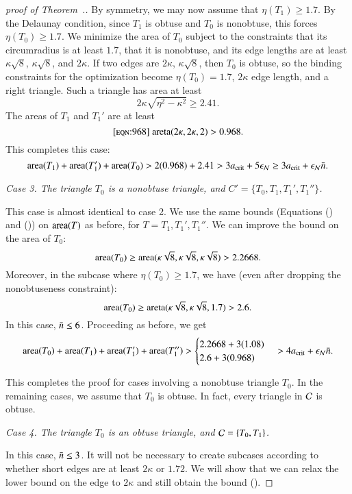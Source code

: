 \begin{proof}[proof of Theorem~.]
By symmetry, we may now assume that $\eta(T_1) \ge 1.7$.  By the
Delaunay condition, since $T_1$ is obtuse and $T_0$ is nonobtuse, this
forces $\eta(T_0)\ge 1.7$.  We minimize the area of $T_0$ subject to
the constraints that its circumradius is at least $1.7$, that it is
nonobtuse, and its edge lengths are at least $\kappa\sqrt{8}$,
$\kappa\sqrt{8}$, and $2\kappa$.  If two edges are $2\kappa$,
$\kappa\sqrt{8}$, then $T_0$ is obtuse, so the binding constraints for
the optimization become $\eta(T_0)=1.7$, $2\kappa$ edge length, and a
right triangle.  Such a triangle has area at least
\[
2\kappa\sqrt{\eta^2 - \kappa^2} \ge 2.41.
\]  
The areas of $T_1$ and $T_1'$ are at least
\begin{equation}\libel{eqn:968}
\areta(2\kappa,2\kappa,2) > 0.968.
\end{equation}
This completes this case:
\[
{\operatorname{area}}(T_1) + {\operatorname{area}}(T_1') + {\operatorname{area}}(T_0) 
>
2(0.968) + 2.41 > 3a_\text{crit} + 5 \epsilon_{\mathcal N} \ge 3a_\text{crit} + \epsilon_{\mathcal N} \bar n.
\] %

{\it Case 3. The triangle $T_0$ is a nonobtuse triangle, and
  $C'=\{T_0,T_1,T_1',T_1''\}$.}

This case is almost identical to case 2.  We use the same bounds
(Equations () and ()) on ${\operatorname{area}}(T)$ as
before, for $T = T_1, T_1', T_1''$.  We can improve the bound on the
area of $T_0$:
\[
{\operatorname{area}}(T_0) 
\ge {\operatorname{area}}(\kappa\sqrt{8},\kappa\sqrt{8},\kappa\sqrt{8}) > 2.2668.
\]
Moreover, in the subcase where $\eta(T_0)\ge 1.7$, we have
(even after dropping the nonobtuseness constraint):
\[
{\operatorname{area}}(T_0) \ge {\operatorname{areta}}(\kappa\sqrt{8},\kappa\sqrt{8},1.7) > 2.6.
\]
In this case, $\bar n\le 6$.  Proceeding as before, we get
\[
{\operatorname{area}}(T_0)  + {\operatorname{area}}(T_1) + {\operatorname{area}}(T_1') + {\operatorname{area}}(T_1'') > 
\begin{cases}
2.2668 + 3 (1.08) \\
2.6 + 3(0.968)
\end{cases}
> 4a_\text{crit} +  \epsilon_{\mathcal N} \bar n.
\] %


This completes the proof for cases involving a nonobtuse triangle
$T_0$.  In the remaining cases, we assume that $T_0$ is obtuse.  In
fact, every triangle in $\mathcal C$ is obtuse.

{\it Case 4. The triangle $T_0$ is an obtuse triangle, and $\mathcal C=\{T_0,T_1\}$.}  

In this case, $\bar n\le 3$.  It will not be necessary to create subcases
according to whether short edges are at least $2\kappa$ or $1.72$.  We
will show that we can relax the lower bound on the edge to $2\kappa$
and still obtain the bound ().


\end{proof}
